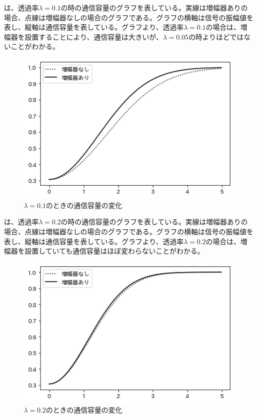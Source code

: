 \newpage
{}は、透過率$\lambda=0.1$の時の通信容量のグラフを表している。実線は増幅器ありの場合、点線は増幅器なしの場合のグラフである。グラフの横軸は信号の振幅値を表し、縦軸は通信容量を表している。グラフより、透過率$\lambda=0.1$の場合は、増幅器を設置することにより、通信容量は大きいが、$\lambda=0.05$の時よりほどではないことがわかる。

    \begin{figure}[H]
        \centering   
        \includegraphics[width=1\textwidth]{img/Fig5_2.png}
        \caption[sample image (png)]{$\lambda=0.1$のときの通信容量の変化}
        \label{Fig5_2}
    \end{figure}


\newpage
{}は、透過率$\lambda=0.2$の時の通信容量のグラフを表している。実線は増幅器ありの場合、点線は増幅器なしの場合のグラフである。グラフの横軸は信号の振幅値を表し、縦軸は通信容量を表している。グラフより、透過率$\lambda=0.2$の場合は、増幅器を設置していても通信容量はほぼ変わらないことがわかる。

    \begin{figure}[H]
        \centering   
        \includegraphics[width=1\textwidth]{img/Fig5_3.png}
        \caption[sample image (png)]{$\lambda=0.2$のときの通信容量の変化}
        \label{Fig5_3}
    \end{figure}



